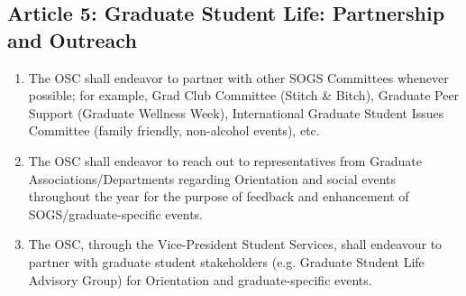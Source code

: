 \subsection{Article 5: Graduate Student Life: Partnership and Outreach}
\begin{enumerate}[label*=\arabic*., align=left]	
\item The OSC shall endeavor to partner with other SOGS Committees whenever possible; for example, Grad Club
Committee (Stitch \& Bitch), Graduate Peer Support (Graduate Wellness Week), International Graduate
Student Issues Committee (family friendly, non-alcohol events), etc.
\item The OSC shall endeavor to reach out to representatives from Graduate Associations/Departments regarding
Orientation and social events throughout the year for the purpose of feedback and enhancement of
SOGS/graduate-specific events.
\item The OSC, through the Vice-President Student Services, shall endeavour to partner with graduate student
stakeholders (e.g. Graduate Student Life Advisory Group) for Orientation and graduate-specific events.
\end{enumerate}
